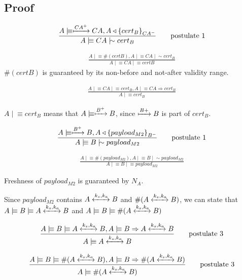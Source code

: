 \documentclass[a4paper,12pt]{article}
\newcommand{\believes}{\mid\!\equiv}
\newcommand{\sees}{\triangleleft}
\newcommand{\oncesaid}{\mid\!\sim}
\newcommand{\controls}{\Rightarrow}
\newcommand{\fresh}[1]{\#(#1)}
\newcommand{\encrypt}[2]{{ \{ #1 \} }_{#2}}
\newcommand{\sharekey}[1]{\xleftrightarrow{#1}}
\newcommand{\pubkey}[1]{\xmapsto{#1}}
\begin{document}
\subsection{Proof}

\begin{align}
\frac{A \believes \pubkey{CA^+} CA, A \sees \encrypt{cert_B}{CA^-}}{A \believes CA \oncesaid cert_B} \tag*{postulate 1}
\end{align}

\begin{align}
\frac{A \believes \fresh{certB}, A \believes CA \oncesaid cert_B}{A \believes CA \believes certB} \tag*{postulate 2}
\end{align}
$\fresh{certB}$ is guaranteed by its non-before and not-after validity range.

\begin{align}
\frac{A \believes CA \believes cert_B, A \believes CA \controls cert_B}{A \believes cert_B} \tag*{postulate 3}
\end{align}

$A \believes cert_B$ means that $A \believes \pubkey{B^+} B$, since $\pubkey{B+} B$ is part of $cert_B$.

\begin{align}
\frac{A \believes \pubkey{B^+} B, A \sees \encrypt{payload_{M2}}{B^-}}{A \believes B \oncesaid payload_{M2}} \tag*{postulate 1}
\end{align}

\begin{align}
\frac{A \believes \fresh{payload_{M2}}, A \believes B \oncesaid payload_{M2}}{A \believes B \believes payload_{M2}} \tag*{postulate 2}
\end{align}

Freshness of $payload_{M2}$ is guaranteed by $N_A$.

Since $payload_{M2}$ contains $A \sharekey{k_s, k_a} B$ and $\fresh{A \sharekey{k_s, k_a} B}$, we can state that $A \believes B \believes A \sharekey{k_s, k_a} B$ and $A \believes B \believes \fresh{A \sharekey{k_s, k_a} B}$

\begin{align}
\frac{A \believes B \believes A \sharekey{k_s, k_a} B, A \believes B \controls A \sharekey{k_s, k_a} B}{A \believes A \sharekey{k_s, k_a} B} \tag*{postulate 3}
\end{align}

\begin{align}
\frac{A \believes B \believes \fresh{A \sharekey{k_s, k_a} B}, A \believes B \controls \fresh{A \sharekey{k_s, k_a} B}}{A \believes \fresh{A \sharekey{k_s, k_a} B}} \tag*{postulate 3}
\end{align}
\end{document}
